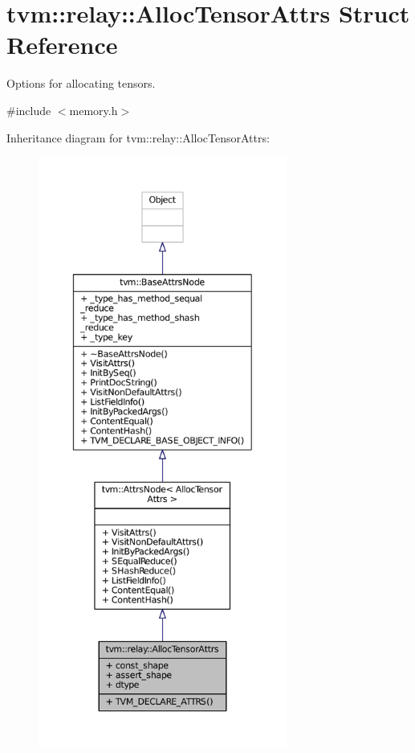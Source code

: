 \hypertarget{structtvm_1_1relay_1_1AllocTensorAttrs}{}\section{tvm\+:\+:relay\+:\+:Alloc\+Tensor\+Attrs Struct Reference}
\label{structtvm_1_1relay_1_1AllocTensorAttrs}


Options for allocating tensors.  




{\ttfamily \#include $<$memory.\+h$>$}



Inheritance diagram for tvm\+:\+:relay\+:\+:Alloc\+Tensor\+Attrs\+:
\nopagebreak
\begin{figure}[H]
\begin{center}
\leavevmode
\includegraphics[height=550pt]{structtvm_1_1relay_1_1AllocTensorAttrs__inherit__graph}
\end{center}
\end{figure}



